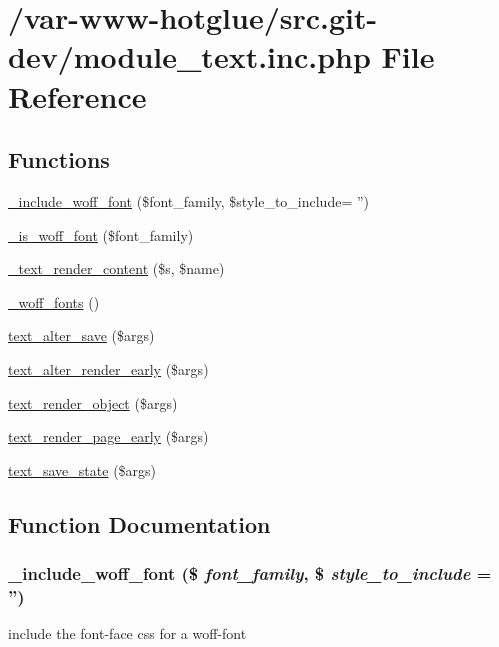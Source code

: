 \hypertarget{module__text_8inc_8php}{
\section{/var-\/www-\/hotglue/src.git-\/dev/module\_\-text.inc.php File Reference}
\label{module__text_8inc_8php}
}
\subsection*{Functions}
\begin{DoxyCompactItemize}
\item 
\hyperlink{module__text_8inc_8php_a1cee3a7df743730d3e13919dede62d85}{\_\-include\_\-woff\_\-font} (\$font\_\-family, \$style\_\-to\_\-include= '')
\item 
\hyperlink{module__text_8inc_8php_a270432cf0918807ddfc6b698539d02e3}{\_\-is\_\-woff\_\-font} (\$font\_\-family)
\item 
\hyperlink{module__text_8inc_8php_a0586b5e177a15f5904d49b8b3aaf19ee}{\_\-text\_\-render\_\-content} (\$s, \$name)
\item 
\hyperlink{module__text_8inc_8php_a579e502fadfb1146d8470c8f409916fd}{\_\-woff\_\-fonts} ()
\item 
\hyperlink{module__text_8inc_8php_aaee0a89ba2b213f761b05ca2d6460910}{text\_\-alter\_\-save} (\$args)
\item 
\hyperlink{module__text_8inc_8php_ac57835ba072c7df9367b2c277d2f5bd7}{text\_\-alter\_\-render\_\-early} (\$args)
\item 
\hyperlink{module__text_8inc_8php_a8e9b1db22ff6cb0f3d20815da6aae6ce}{text\_\-render\_\-object} (\$args)
\item 
\hyperlink{module__text_8inc_8php_aaaa8b8407d795f6dba9d258f1457ade8}{text\_\-render\_\-page\_\-early} (\$args)
\item 
\hyperlink{module__text_8inc_8php_a7fa0ea2ee517914595d7eda355177289}{text\_\-save\_\-state} (\$args)
\end{DoxyCompactItemize}


\subsection{Function Documentation}
\hypertarget{module__text_8inc_8php_a1cee3a7df743730d3e13919dede62d85}{
\subsubsection[{\_\-include\_\-woff\_\-font}]{\setlength{\rightskip}{0pt plus 5cm}\_\-include\_\-woff\_\-font (\$ {\em font\_\-family}, \/  \$ {\em style\_\-to\_\-include} = {\ttfamily ''})}}
\label{module__text_8inc_8php_a1cee3a7df743730d3e13919dede62d85}
include the font-\/face css for a woff-\/font


